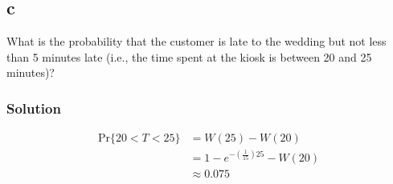 \documentclass[letterpaper]{amsart}
\begin{document}
\subsection*{c}
What is the probability that the customer is late to the wedding but not
less than 5 minutes late (i.e., the time spent at the kiosk is between 20
and 25 minutes)?
\subsubsection*{Solution}
\begin{align*}
\text{Pr}\{20<T<25\}&=W(25)-W(20) \\
  &= 1-e^{-(\frac{1}{15})25} -W(20)\\
  &\approx 0.075
\end{align*}
\end{document}

